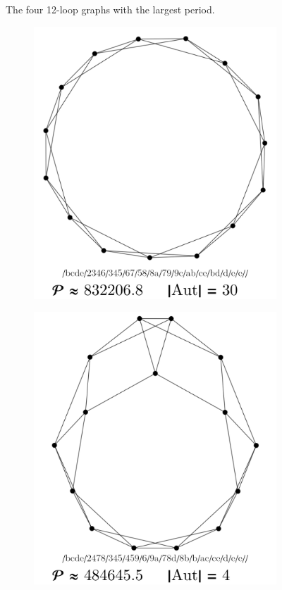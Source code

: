 \documentclass[11pt,a4paper]{article}
\renewcommand{\|}{\rule[-0.4ex]{0.2ex}{1.2em}}
\begin{document}
\begin{figure}[htb]
	\caption{The four 12-loop graphs with the largest period.}
	\label{largest_12}
\end{figure}



\begin{figure}[htb]
	\begin{subfigure}[b]{.24 \textwidth}
		\includegraphics[width=\linewidth]{largest_13_1}
		\subcaption{}
	\end{subfigure}
	\begin{subfigure}[b]{.24 \textwidth}
		\includegraphics[width=\linewidth]{largest_13_2}

\end{subfigure}
\end{figure}
\end{document}
